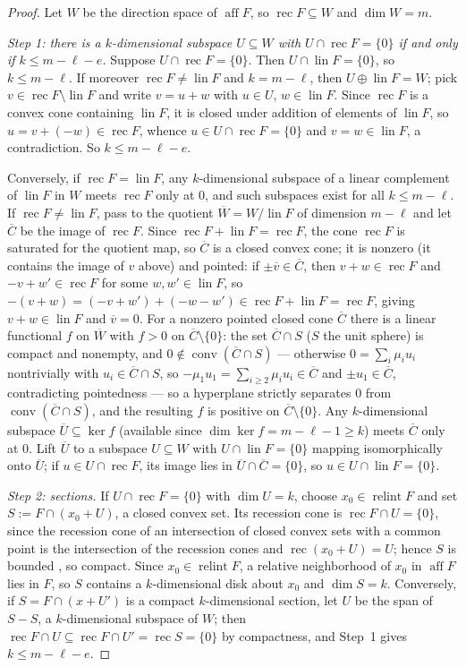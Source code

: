 \documentclass[11pt]{amsart}
\theoremstyle{definition}
\newcommand{\aff}{\operatorname{aff}}
\newcommand{\conv}{\operatorname{conv}}
\newcommand{\relint}{\operatorname{relint}}
\newcommand{\rec}{\operatorname{rec}}
\newcommand{\lin}{\operatorname{lin}}
\begin{document}
\begin{proof}
Let $W$ be the direction space of $\aff F$, so $\rec F\subseteq W$ and
$\dim W=m$.

\emph{Step 1: there is a $k$-dimensional subspace $U\subseteq W$ with
$U\cap\rec F=\{0\}$ if and only if $k\le m-\ell-e$.}
Suppose $U\cap\rec F=\{0\}$. Then $U\cap\lin F=\{0\}$, so $k\le m-\ell$.
If moreover $\rec F\ne\lin F$ and $k=m-\ell$, then $U\oplus\lin F=W$; pick
$v\in\rec F\setminus\lin F$ and write $v=u+w$ with $u\in U$, $w\in\lin F$.
Since $\rec F$ is a convex cone containing $\lin F$, it is closed under
addition of elements of $\lin F$, so $u=v+(-w)\in\rec F$, whence
$u\in U\cap\rec F=\{0\}$ and $v=w\in\lin F$, a contradiction. So
$k\le m-\ell-e$.

Conversely, if $\rec F=\lin F$, any $k$-dimensional subspace of a linear
complement of $\lin F$ in $W$ meets $\rec F$ only at $0$, and such subspaces
exist for all $k\le m-\ell$. If $\rec F\ne\lin F$, pass to the quotient
$\overline W=W/\lin F$ of dimension $m-\ell$ and let $\overline C$ be the
image of $\rec F$. Since $\rec F+\lin F=\rec F$, the cone $\rec F$ is
saturated for the quotient map, so $\overline C$ is a closed convex cone; it
is nonzero (it contains the image of $v$ above) and pointed: if
$\pm\overline v\in\overline C$, then $v+w\in\rec F$ and
$-v+w'\in\rec F$ for some $w,w'\in\lin F$, so
$-(v+w)=(-v+w')+(-w-w')\in\rec F+\lin F=\rec F$, giving
$v+w\in\lin F$ and $\overline v=0$. For a nonzero pointed closed cone
$\overline C$ there is a linear functional $f$ on $\overline W$ with $f>0$ on
$\overline C\setminus\{0\}$: the set $\overline C\cap S$ ($S$ the unit
sphere) is compact and nonempty, and $0\notin\conv(\overline C\cap S)$ ---
otherwise $0=\sum_i\mu_iu_i$ nontrivially with $u_i\in\overline C\cap S$,
so $-\mu_1u_1=\sum_{i\ge2}\mu_iu_i\in\overline C$ and
$\pm u_1\in\overline C$, contradicting pointedness --- so a hyperplane
strictly separates $0$ from $\conv(\overline C\cap S)$, and the resulting
$f$ is positive on $\overline C\setminus\{0\}$. Any $k$-dimensional subspace
$\overline U\subseteq\ker f$ (available since
$\dim\ker f=m-\ell-1\ge k$) meets $\overline C$ only at $0$. Lift
$\overline U$ to a subspace $U\subseteq W$ with $U\cap\lin F=\{0\}$ mapping
isomorphically onto $\overline U$; if $u\in U\cap\rec F$, its image lies in
$\overline U\cap\overline C=\{0\}$, so $u\in U\cap\lin F=\{0\}$.

\emph{Step 2: sections.} If $U\cap\rec F=\{0\}$ with $\dim U=k$, choose
$x_0\in\relint F$ and set $S:=F\cap(x_0+U)$, a closed convex set. Its
recession cone is $\rec F\cap U=\{0\}$, since the recession cone of an
intersection of closed convex sets with a common point is the intersection
of the recession cones \cite[Corollary~8.3.3]{Rockafellar70} and
$\rec(x_0+U)=U$; hence $S$ is bounded \cite[Theorem~8.4]{Rockafellar70},
so compact. Since $x_0\in\relint F$, a relative neighborhood of $x_0$ in
$\aff F$ lies in $F$, so $S$ contains a $k$-dimensional disk about $x_0$ and
$\dim S=k$. Conversely, if $S=F\cap(x+U')$ is a compact $k$-dimensional
section, let $U$ be the span of $S-S$, a $k$-dimensional subspace of $W$;
then $\rec F\cap U\subseteq\rec F\cap U'=\rec S=\{0\}$ by compactness, and
Step~1 gives $k\le m-\ell-e$.


\end{proof}
\end{document}
